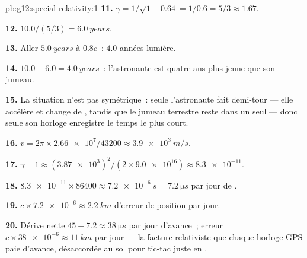 \begin{solution}{pb:g12:special-relativity:1}
\textbf{11.} $\gamma = 1/\sqrt{1 - 0.64} = 1/0.6 = 5/3 \approx 1.67$.

\textbf{12.} $10.0/(5/3) = \qty{6.0}{years}$.

\textbf{13.} Aller $\qty{5.0}{years}$ à $0.8c$~: $4.0$
années-lumière.

\textbf{14.} $10.0 - 6.0 = \qty{4.0}{years}$~: l'astronaute est
quatre ans plus jeune que son jumeau.

\textbf{15.} La situation n'est pas symétrique~: seule l'astronaute
fait demi-tour --- elle accélère et change de
, tandis que le jumeau
terrestre reste dans un seul --- donc seule son horloge enregistre le
temps le plus court.

\textbf{16.} $v = 2\pi \times \num{2.66e7}/\num{43200} \approx
\qty{3.9e3}{m/s}$.

\textbf{17.} $\gamma - 1 \approx (\num{3.87e3})^2/(2 \times
\num{9.0e16}) \approx \num{8.3e-11}$.

\textbf{18.} $\num{8.3e-11} \times \num{86400} \approx \qty{7.2e-6}{s}
= \qty{7.2}{\micro s}$ par jour de .

\textbf{19.} $c \times \num{7.2e-6} \approx \qty{2.2}{km}$ d'erreur de
position par jour.

\textbf{20.} Dérive nette $45 - 7.2 \approx \qty{38}{\micro s}$ par
jour d'avance~; erreur $c \times \num{38e-6} \approx \qty{11}{km}$
par jour --- la facture relativiste que chaque horloge GPS paie
d'avance, désaccordée au sol pour tic-tac juste en
.
\end{solution}
